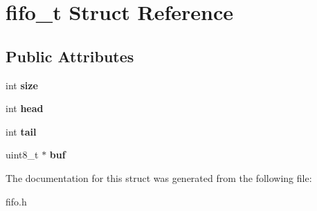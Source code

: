 \hypertarget{structfifo__t}{\section{fifo\-\_\-t Struct Reference}
\label{structfifo__t}
}
\subsection*{Public Attributes}
\begin{DoxyCompactItemize}
\item 
\hypertarget{structfifo__t_adfe58cd24e80a0d62cf830bcc83f5c01}{int {\bfseries size}}\label{structfifo__t_adfe58cd24e80a0d62cf830bcc83f5c01}

\item 
\hypertarget{structfifo__t_ae93028e986799fceacecbd153729f855}{int {\bfseries head}}\label{structfifo__t_ae93028e986799fceacecbd153729f855}

\item 
\hypertarget{structfifo__t_abe914ae9dd92644d8a53a4b99d89b487}{int {\bfseries tail}}\label{structfifo__t_abe914ae9dd92644d8a53a4b99d89b487}

\item 
\hypertarget{structfifo__t_a6179dabda649717df17b5a38dbf0d744}{uint8\-\_\-t $\ast$ {\bfseries buf}}\label{structfifo__t_a6179dabda649717df17b5a38dbf0d744}

\end{DoxyCompactItemize}


The documentation for this struct was generated from the following file\-:\begin{DoxyCompactItemize}
\item 
fifo.\-h\end{DoxyCompactItemize}
